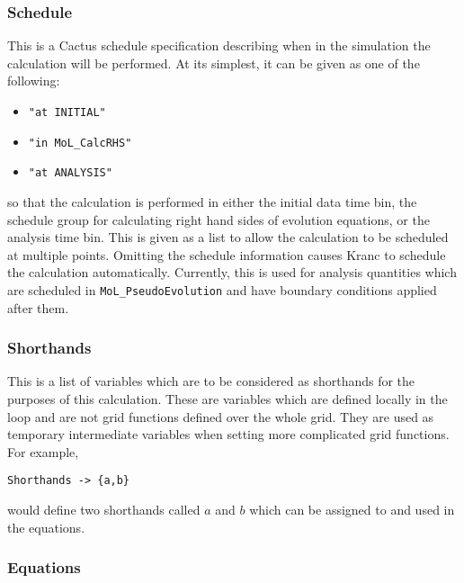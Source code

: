 \documentclass{report}
\begin{document}
\subsubsection{Schedule}

This is a Cactus schedule specification describing
when in the simulation the calculation will be performed.  At its
simplest, it can be given as one of the following:
\begin{itemize}
\item {\tt "at INITIAL"}
\item {\tt "in MoL\_CalcRHS"}
\item {\tt "at ANALYSIS"}
\end{itemize}
so that the calculation is performed in either the initial data time
bin, the schedule group for calculating right hand sides of evolution
equations, or the analysis time bin.  This is given as a list to allow
the calculation to be scheduled at multiple points.  Omitting the
schedule information causes Kranc to schedule the calculation
automatically.  Currently, this is used for analysis quantities which
are scheduled in \verb|MoL_PseudoEvolution| and have boundary
conditions applied after them.

\subsubsection{Shorthands}

This is a list of variables which are to be considered as
shorthands for the purposes of this calculation.  These are variables
which are defined locally in the loop and are not grid functions
defined over the whole grid.  They are used as temporary intermediate
variables when setting more complicated grid functions.  For example,
\begin{center}
\begin{minipage}{0.8 \textwidth}
\begin{verbatim}
Shorthands -> {a,b}
\end{verbatim}
\end{minipage}
\end{center}
would define two shorthands called $a$ and $b$ which can be assigned
to and used in the equations.

\subsubsection{Equations}
\end{document}
